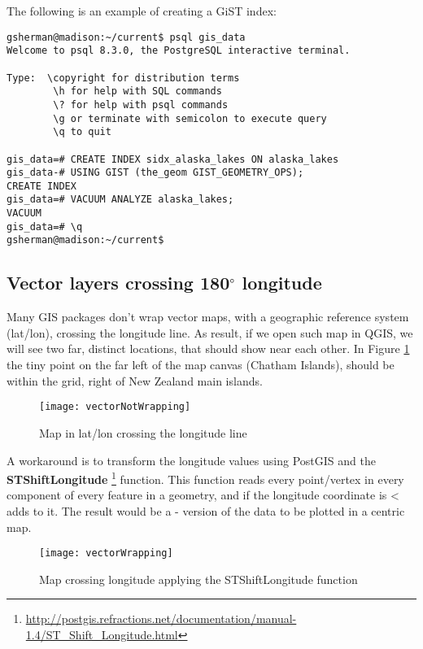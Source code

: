 The following is an example of creating a GiST index:
\begin{verbatim}
gsherman@madison:~/current$ psql gis_data
Welcome to psql 8.3.0, the PostgreSQL interactive terminal.

Type:  \copyright for distribution terms
        \h for help with SQL commands
        \? for help with psql commands
        \g or terminate with semicolon to execute query
        \q to quit

gis_data=# CREATE INDEX sidx_alaska_lakes ON alaska_lakes
gis_data-# USING GIST (the_geom GIST_GEOMETRY_OPS);
CREATE INDEX
gis_data=# VACUUM ANALYZE alaska_lakes;
VACUUM
gis_data=# \q
gsherman@madison:~/current$
\end{verbatim}

\subsection{Vector layers crossing 180$^\circ$ longitude}

Many GIS packages don't wrap vector maps, with a geographic reference system
(lat/lon), crossing the  longitude line. As result, if
we open such map in QGIS, we will see two far, distinct locations, that
should show near each other. In Figure \ref{fig:vector_not_wrapping} the tiny
point on the far left of the map canvas (Chatham Islands), should be within
the grid, right of New Zealand main islands.

\begin{figure}[ht]
   \centering
   \caption{Map in lat/lon crossing the  longitude line
   \nixcaption}
   \label{fig:vector_not_wrapping}
   \texttt{[image: vectorNotWrapping]}
\end{figure}

A workaround is to transform the longitude values using PostGIS and the
\textbf{ST\textunderscore Shift\textunderscore Longitude}
\footnote{\url{http://postgis.refractions.net/documentation/manual-1.4/ST_Shift_Longitude.html}}
function. This function reads every point/vertex in every component of every
feature in a geometry, and if the longitude coordinate is <  adds
 to it. The result would be a  -  version of
the data to be plotted in a  centric map.

\begin{figure}[ht]
   \centering
   \caption{Map crossing  longitude applying the ST\textunderscore Shift\textunderscore Longitude function \nixcaption}
\label{fig:vector_wrapping}
   \texttt{[image: vectorWrapping]}
\end{figure}


